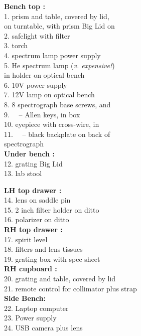 \documentclass[12pt]{article}
\begin{document}
\parbox[t]{80mm}{
{\bf Bench top : } \\
1. prism and table, covered by lid,\\
\hspace*{6mm}on turntable, with prism Big Lid on\\
2. safelight with filter \\
3. torch\\
4. spectrum lamp power supply\\
5. He spectrum lamp ({\em v. expensive!\/})\\
\hspace*{6mm}in holder on optical bench\\
6. 10V power supply\\
7. 12V lamp on optical bench\\
8. 8 spectrograph base screws, and\\
9. ~~-- Allen keys, in box\\
10. eyepiece with cross-wire, in\\
11. ~~-- black backplate on back of\\
\hspace*{6mm}spectrograph\\

{\bf Under bench : }\\
12. grating Big Lid\\
13. lab stool}
\parbox[t]{80mm}{
{\bf LH top drawer : }\\
14. lens on saddle pin\\
15. 2 inch filter holder on ditto\\
16. polarizer on ditto\\

{\bf RH top drawer : }\\
17. spirit level\\
18. filters and lens tissues\\
19. grating box with spec sheet\\

{\bf RH cupboard : }\\
20. grating and table, covered by lid\\
21. remote control for collimator plus strap\\

{\bf Side Bench: }\\
22. Laptop computer\\
23. Power supply \\
24. USB camera plus lens\\
}
\end{document}
